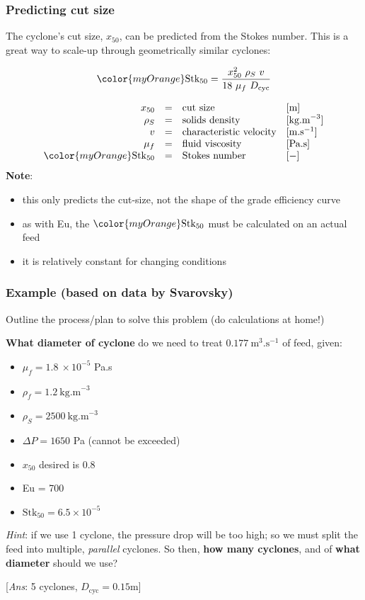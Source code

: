 \begin{frame}\frametitle{Predicting cut size}
	The cyclone's cut size, $x_{50}$, can be predicted from the Stokes number. This is a great way to scale-up through geometrically similar cyclones:
	\begin{exampleblock}{}
		\[{\color{myOrange}\text{Stk}_{50}} = \dfrac{x_{50}^2 \,\,\rho_S \,\,v}{18\,\, \mu_f \,\,D_\text{cyc}}\]
	\end{exampleblock}
	\[
		\begin{array}{rcll}
			x_{50}		&=& \text{cut size} 				&[\text{m}]\\
			\rho_S		&=& \text{solids density} 			&[\text{kg.m}^{-3}]\\
			v 			&=& \text{characteristic velocity} 	&[\text{m.s}^{-1}]\\
			\mu_f	    &=& \text{fluid viscosity}        	&[\text{Pa.s}]\\
			{\color{myOrange}\text{Stk}_{50}} &=& \text{Stokes number}  & [-]
		\end{array}
	\]
	\textbf{Note}: 
	\begin{itemize}
		\item	this only predicts the cut-size, not the shape of the grade efficiency curve
		\item	as with Eu, the ${\color{myOrange}\text{Stk}_{50}}$ must be calculated on an actual feed
		\item	it is relatively constant for changing conditions
	\end{itemize}
\end{frame}

\begin{frame}\frametitle{Example (based on data by Svarovsky)}
	
	Outline the process/plan to solve this problem (do calculations at home!)
	
	\vspace{12pt}
	\textbf{What diameter of cyclone} do we need to treat $0.177~\text{m}^3\text{.s}^{-1}$ of feed, given:
	\begin{itemize}
		\item	$\mu_f = 1.8~\times 10^{-5}$ Pa.s
		\item	$\rho_f = 1.2~\text{kg.m}^{-3}$
		\item	$\rho_S	= 2500~\text{kg.m}^{-3}$
		\item	$\Delta P = 1650$ Pa (cannot be exceeded)
		\item	$x_{50}$ desired is 0.8 \micron
		\item	Eu = 700
		\item	$\text{Stk}_{50} = 6.5 \times 10^{-5}$
	\end{itemize}
	\emph{Hint}: if we use 1 cyclone, the pressure drop will be too high; so we must split the feed into multiple, \emph{parallel} cyclones. So then,
	\textbf{how many cyclones}, and of \textbf{what diameter} should we use?
	
	\vspace{8pt}
	{\scriptsize {\color{myOrange}[\emph{Ans}: 5 cyclones, $D_\text{cyc}=0.15$m]}}
\end{frame}

